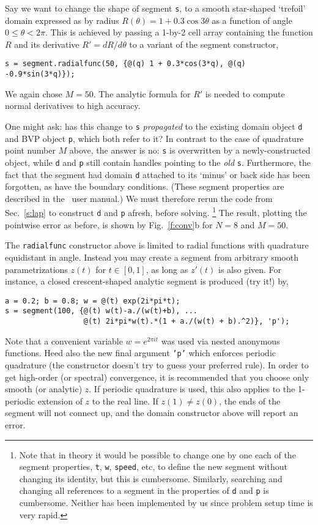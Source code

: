 Say we want to change the shape of segment {\tt s}, to
a smooth star-shaped `trefoil' domain expressed as by radius $R(\theta) =
1 + 0.3\cos 3\theta$ as a function of angle $0\le \theta< 2\pi$.
This is achieved by passing a 1-by-2
cell array containing the function $R$ and its
derivative $R' = dR/d\theta$ to a variant of the segment constructor,
\begin{verbatim}
s = segment.radialfunc(50, {@(q) 1 + 0.3*cos(3*q), @(q) -0.9*sin(3*q)});
\end{verbatim}
We again chose $M=50$.
The analytic formula for $R'$ is needed to compute normal derivatives
to high accuracy.

One might ask: has this change to {\tt s} {\em propagated}
to the existing domain
object {\tt d} and BVP object {\tt p}, which both refer to it?
In contrast to the case of quadrature point number $M$ above,
the answer is no:
{\tt s} is overwritten by a newly-constructed object, while
{\tt d} and {\tt p} still contain handles pointing to the {\em old}
{\tt s}.
Furthermore, the fact that the segment had domain {\tt d}
attached to its `minus' or back side has been forgotten, as have the
boundary conditions.
(These segment properties are described in the \mpspack\ user manual.)
We must therefore rerun the code from Sec.~\ref{s:lap}
to construct {\tt d} and {\tt p} afresh, before solving.%
  \footnote{Note that in theory it would be possible to
    change one by one each of the segment properties, {\tt t}, {\tt w},
    {\tt speed}, etc, to define the new segment without changing its identity,
    but this is cumbersome. Similarly, searching and changing
    all references to a segment in the properties of {\tt d} and {\tt p}
    is cumbersome. Neither has been implemented by us
    since problem setup time is very rapid.}
The result, plotting the pointwise error as before,
is shown by Fig.~\ref{f:conv}b for $N=8$ and $M=50$.

The {\tt radialfunc} constructor above is limited to radial functions
with quadrature equidistant
in angle. Instead you may create a segment from arbitrary
smooth parametrizations $z(t)$ for $t \in[0,1]$, as long as $z'(t)$
is also given. For instance, a closed crescent-shaped analytic segment is
produced (try it!) by,
\begin{verbatim}
a = 0.2; b = 0.8; w = @(t) exp(2i*pi*t);
s = segment(100, {@(t) w(t)-a./(w(t)+b), ...
                  @(t) 2i*pi*w(t).*(1 + a./(w(t) + b).^2)}, 'p');
\end{verbatim}
Note that a convenient variable $w = e^{2\pi i t}$ was used
via nested anonymous functions.
Heed also the new final argument {\tt 'p'} which enforces
periodic quadrature (the constructor doesn't try to guess your preferred rule).
In order to get high-order (or spectral) convergence, it is recommended
that you choose only smooth (or analytic) $z$.
If periodic quadrature is used,
this also applies to the 1-periodic extension of $z$ to the real line.
If $z(1)\neq z(0)$, the ends of the segment will not connect
up, and the domain constructor above will report an error.

